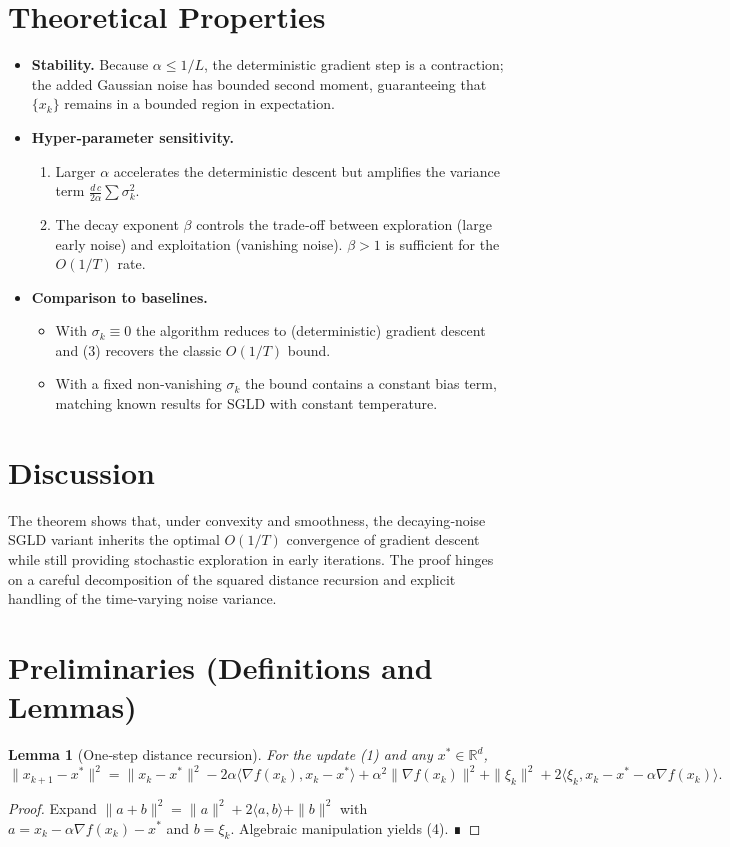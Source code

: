 \documentclass{article}
\newtheorem{lemma}{Lemma}
\newcommand{\R}{\mathbb{R}}
\begin{document}
\section*{Theoretical Properties}
\begin{itemize}
\item \textbf{Stability.} Because $\alpha\le 1/L$, the deterministic gradient step is a contraction; the added Gaussian noise has bounded second moment, guaranteeing that $\{x_{k}\}$ remains in a bounded region in expectation.
\item \textbf{Hyper‑parameter sensitivity.}
    \begin{enumerate}[label=(\alph*)]
    \item Larger $\alpha$ accelerates the deterministic descent but amplifies the variance term $\frac{d\,c}{2\alpha}\sum\sigma_{k}^{2}$.
    \item The decay exponent $\beta$ controls the trade‑off between exploration (large early noise) and exploitation (vanishing noise). $\beta>1$ is sufficient for the $O(1/T)$ rate.
    \end{enumerate}
\item \textbf{Comparison to baselines.}
    \begin{itemize}
    \item With $\sigma_{k}\equiv0$ the algorithm reduces to (deterministic) gradient descent and (3) recovers the classic $O(1/T)$ bound.
    \item With a fixed non‑vanishing $\sigma_{k}$ the bound contains a constant bias term, matching known results for SGLD with constant temperature.
    \end{itemize}
\end{itemize}

\section*{Discussion}
The theorem shows that, under convexity and smoothness, the decaying‑noise SGLD variant inherits the optimal $O(1/T)$ convergence of gradient descent while still providing stochastic exploration in early iterations. The proof hinges on a careful decomposition of the squared distance recursion and explicit handling of the time‑varying noise variance.

\newpage
\section*{Preliminaries (Definitions and Lemmas)}
\begin{lemma}[One‑step distance recursion]\label{lem:recursion}
For the update (1) and any $x^{*}\in\R^{d}$,
\[
\|x_{k+1}-x^{*}\|^{2}
= \|x_{k}-x^{*}\|^{2}
-2\alpha\langle \nabla f(x_{k}),x_{k}-x^{*}\rangle
+\alpha^{2}\|\nabla f(x_{k})\|^{2}
+\|\xi_{k}\|^{2}
+2\langle \xi_{k},x_{k}-x^{*}-\alpha\nabla f(x_{k})\rangle .
\tag{4}
\]
\end{lemma}
\begin{proof}
Expand $\|a+b\|^{2}=\|a\|^{2}+2\langle a,b\rangle+\|b\|^{2}$ with  
$a=x_{k}-\alpha\nabla f(x_{k})-x^{*}$ and $b=\xi_{k}$.  Algebraic manipulation yields (4). ∎
\end{proof}
\end{document}
